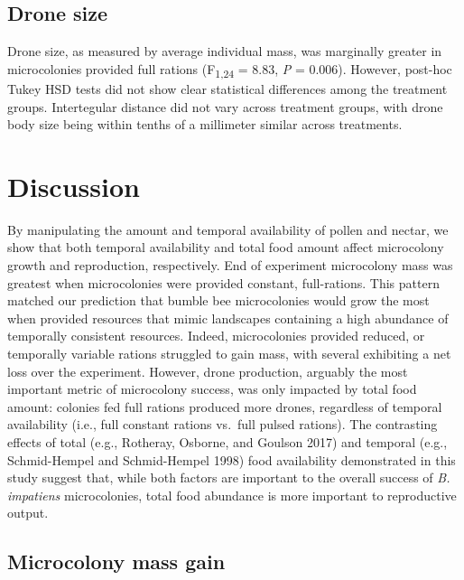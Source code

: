 \documentclass[11pt,]{article}
\begin{document}
\hypertarget{drone-size}{%
\subsection{Drone size}\label{drone-size}}

Drone size, as measured by average individual mass, was marginally
greater in microcolonies provided full rations (F\textsubscript{1,24} =
8.83, \emph{P} = 0.006). However, post-hoc Tukey HSD tests did not show
clear statistical differences among the treatment groups. Intertegular
distance did not vary across treatment groups, with drone body size
being within tenths of a millimeter similar across treatments.

\hypertarget{discussion}{%
\section{Discussion}\label{discussion}}

By manipulating the amount and temporal availability of pollen and
nectar, we show that both temporal availability and total food amount
affect microcolony growth and reproduction, respectively. End of
experiment microcolony mass was greatest when microcolonies were
provided constant, full-rations. This pattern matched our prediction
that bumble bee microcolonies would grow the most when provided
resources that mimic landscapes containing a high abundance of
temporally consistent resources. Indeed, microcolonies provided reduced,
or temporally variable rations struggled to gain mass, with several
exhibiting a net loss over the experiment. However, drone production,
arguably the most important metric of microcolony success, was only
impacted by total food amount: colonies fed full rations produced more
drones, regardless of temporal availability (i.e., full constant rations
vs.~full pulsed rations). The contrasting effects of total (e.g.,
Rotheray, Osborne, and Goulson 2017) and temporal (e.g., Schmid-Hempel
and Schmid-Hempel 1998) food availability demonstrated in this study
suggest that, while both factors are important to the overall success of
\emph{B. impatiens} microcolonies, total food abundance is more
important to reproductive output.

\hypertarget{microcolony-mass-gain}{%
\subsection{Microcolony mass gain}\label{microcolony-mass-gain}}
\end{document}
